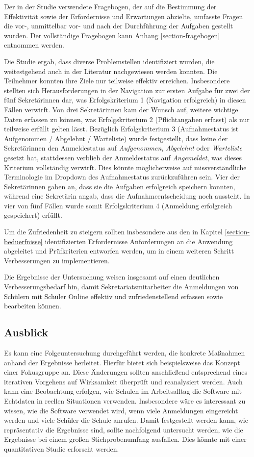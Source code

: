 Der in der Studie verwendete Fragebogen, der auf die Bestimmung der Effektivität sowie der Erfordernisse und Erwartungen abzielte, umfasste Fragen die vor-, unmittelbar vor- und nach der Durchführung der Aufgaben gestellt wurden. Der vollständige Fragebogen kann Anhang \ref{section-fragebogen} entnommen werden.

Die Studie ergab, dass diverse Problemstellen identifiziert wurden, die weitestgehend auch in der Literatur nachgewiesen werden konnten. Die Teilnehmer konnten ihre Ziele nur teilweise effektiv erreichen. Insbesondere stellten sich Herausforderungen in der Navigation zur ersten Aufgabe für zwei der fünf Sekretärinnen dar, was Erfolgskriterium 1 (Navigation erfolgreich) in diesen Fällen verwirft. Von drei Sekretärinnen kam der Wunsch auf, weitere wichtige Daten erfassen zu können, was Erfolgskriterium 2 (Pflichtangaben erfasst) als nur teilweise erfüllt gelten lässt. Bezüglich Erfolgskriterium 3 (Aufnahmestatus ist Aufgenommen / Abgelehnt / Warteliste) wurde festgestellt, dass keine der Sekretärinnen den Anmeldestatus auf \textit{Aufgenommen}, \textit{Abgelehnt} oder \textit{Warteliste} gesetzt hat, stattdessen verblieb der Anmeldestatus auf \textit{Angemeldet}, was dieses Kriterium vollständig verwirft. Dies könnte möglicherweise auf missverständliche Terminologie im Dropdown des Aufnahmestatus zurückzuführen sein. 
Vier der Sekretärinnen gaben an, dass sie die Aufgaben erfolgreich speichern konnten, während eine Sekretärin angab, dass die Aufnahmeentscheidung noch aussteht. In vier von fünf Fällen wurde somit Erfolgskriterium 4 (Anmeldung erfolgreich gespeichert) erfüllt.

Um die Zufriedenheit zu steigern sollten insbesondere aus den in Kapitel \ref{section-beduerfnisse} identifizierten Erfordernisse Anforderungen an die Anwendung abgeleitet und Prüfkriterien entworfen werden, um in einem weiteren Schritt Verbesserungen zu implementieren.   

Die Ergebnisse der Untersuchung weisen insgesamt auf einen deutlichen Verbesserungsbedarf hin, damit Sekretariatsmitarbeiter die Anmeldungen von Schülern mit Schüler Online effektiv und zufriedenstellend erfassen sowie bearbeiten können.

\subsection{Ausblick}
Es kann eine Folgeuntersuchung durchgeführt werden, die konkrete Maßnahmen anhand der Ergebnisse herleitet. Hierfür bietet sich beispielsweise das Konzept einer Fokusgruppe an. Diese Änderungen sollten anschließend entsprechend eines iterativen Vorgehens auf Wirksamkeit überprüft und reanalysiert werden. 
Auch kann eine Beobachtung erfolgen, wie Schulen im Arbeitsalltag die Software mit Echtdaten in reellen Situationen verwenden. Insbesondere wäre es interessant zu wissen, wie die Software verwendet wird, wenn viele Anmeldungen eingereicht werden und viele Schüler die Schule anrufen.
Damit festgestellt werden kann, wie repräsentativ die Ergebnisse sind, sollte nachfolgend untersucht werden, wie die Ergebnisse bei einem großen Stichprobenumfang ausfallen. Dies könnte mit einer quantitativen Studie erforscht werden.
